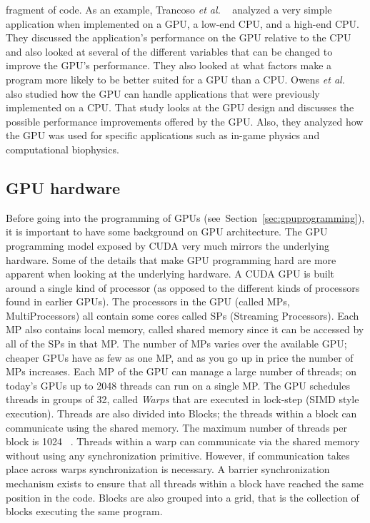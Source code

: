 \documentclass[Ingles]{ic-tese-v1}
\newcommand{\etal}{{\em et al. }}
\newcommand{\rsec}[1]{Section~\ref{sec:#1}}
\newcommand{\tit}[1]{{\textit{#1}}}
\begin{document}
fragment of code.
As an example, Trancoso \etal~\cite{Trancoso2005} analyzed a very simple
application when implemented on a GPU, a low-end CPU, and a high-end CPU. They
discussed the application’s performance on the GPU relative to the CPU and also
looked at several of the different variables that can be changed to improve the
GPU’s performance. They also looked at what factors make a program more likely
to be better suited for a GPU than a CPU. Owens
\etal~\cite{Owens2008} also studied how the GPU can handle applications that
were previously implemented on a CPU. That study looks at the GPU design and
discusses the possible performance improvements offered by the GPU. Also,
they analyzed how the GPU was used for specific applications such as in-game
physics and computational biophysics.

\subsection{GPU hardware}
\label{sec:gpugardware}
Before going into the programming of GPUs (see~\rsec{gpuprogramming}), it is
important to have some background on GPU architecture.  The GPU programming
model exposed by CUDA very much mirrors the underlying hardware. Some of the
details that make GPU programming hard are more apparent when looking at the
underlying hardware.  A CUDA GPU is built around a single kind of processor (as
opposed to the different kinds of processors found in earlier GPUs). The
processors in the GPU (called MPs, MultiProcessors) all contain some
cores called SPs (Streaming Processors).  Each MP also contains local memory,
called shared memory since it can be accessed by all of the SPs in that MP. The
number of MPs varies over the available GPU; cheaper GPUs have as few as one
MP, and as you go up in price the number of MPs increases.  Each MP of the GPU
can manage a large number of threads; on today’s GPUs up to 2048 threads can
run on a single MP. The GPU schedules threads in groups of 32, called \tit{Warps}
that are executed in lock-step (SIMD style execution). Threads are also divided
into Blocks; the threads within a block can communicate using the shared
memory. The maximum number of threads per block is 1024
~\cite{NvidiaGuide2018}. Threads within a warp can communicate via the shared
memory without using any synchronization primitive. However, if communication
takes place across warps synchronization is necessary. A barrier
synchronization mechanism exists to ensure that all threads within a block have
reached the same position in the code. Blocks are also grouped into a grid,
that is the collection of blocks executing the same program.
\end{document}
